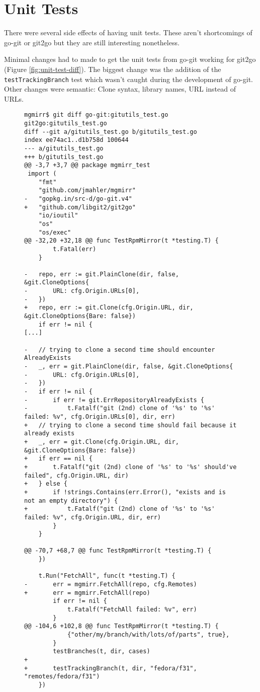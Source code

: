 \documentclass{article}
\begin{document}
\appendix
\appendixpage
\addappheadtotoc

\section{Unit Tests}

There were several side effects of having unit tests.
These aren't shortcomings of go-git or git2go but they
are still interesting nonetheless.

Minimal changes had to made to get the unit tests from go-git
working for git2go (Figure \ref{fig:unit-test-diff}).
The biggest change was the addition of the \verb+testTrackingBranch+
test which wasn't caught during the development of go-git.
Other changes were semantic: Clone syntax, library names, URL instead
of URLs.

\begin{figure}[!ht]
\begin{lstlisting}
mgmirr$ git diff go-git:gitutils_test.go git2go:gitutils_test.go
diff --git a/gitutils_test.go b/gitutils_test.go
index ee74ac1..d1b758d 100644
--- a/gitutils_test.go
+++ b/gitutils_test.go
@@ -3,7 +3,7 @@ package mgmirr_test
 import (
 	"fmt"
 	"github.com/jmahler/mgmirr"
-	"gopkg.in/src-d/go-git.v4"
+	"github.com/libgit2/git2go"
 	"io/ioutil"
 	"os"
 	"os/exec"
@@ -32,20 +32,18 @@ func TestRpmMirror(t *testing.T) {
 		t.Fatal(err)
 	}

-	repo, err := git.PlainClone(dir, false, &git.CloneOptions{
-		URL: cfg.Origin.URLs[0],
-	})
+	repo, err := git.Clone(cfg.Origin.URL, dir, &git.CloneOptions{Bare: false})
 	if err != nil {
[...]

-	// trying to clone a second time should encounter AlreadyExists
-	_, err = git.PlainClone(dir, false, &git.CloneOptions{
-		URL: cfg.Origin.URLs[0],
-	})
-	if err != nil {
-		if err != git.ErrRepositoryAlreadyExists {
-			t.Fatalf("git (2nd) clone of '%s' to '%s' failed: %v", cfg.Origin.URLs[0], dir, err)
+	// trying to clone a second time should fail because it already exists
+	_, err = git.Clone(cfg.Origin.URL, dir, &git.CloneOptions{Bare: false})
+	if err == nil {
+		t.Fatalf("git (2nd) clone of '%s' to '%s' should've failed", cfg.Origin.URL, dir)
+	} else {
+		if !strings.Contains(err.Error(), "exists and is not an empty directory") {
+			t.Fatalf("git (2nd) clone of '%s' to '%s' failed: %v", cfg.Origin.URL, dir, err)
 		}
 	}

@@ -70,7 +68,7 @@ func TestRpmMirror(t *testing.T) {
 	})

 	t.Run("FetchAll", func(t *testing.T) {
-		err = mgmirr.FetchAll(repo, cfg.Remotes)
+		err = mgmirr.FetchAll(repo)
 		if err != nil {
 			t.Fatalf("FetchAll failed: %v", err)
 		}
@@ -104,6 +102,8 @@ func TestRpmMirror(t *testing.T) {
 			{"other/my/branch/with/lots/of/parts", true},
 		}
 		testBranches(t, dir, cases)
+
+		testTrackingBranch(t, dir, "fedora/f31", "remotes/fedora/f31")
 	})


\end{lstlisting}
\end{figure}
\end{document}
